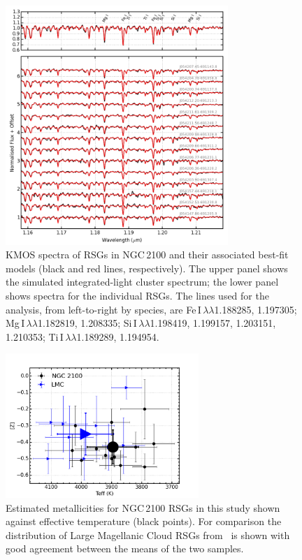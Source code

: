 \begin{figure}
 \begin{center}
 \centering
\includegraphics[width=0.75\textwidth]{ngc2100/NGC2100-model-fits}
\caption[KMOS spectra and best-fit model spectra in NGC\,2100]{KMOS spectra of RSGs in NGC\,2100 and their associated best-fit models
(black and red lines, respectively).
The upper panel shows the simulated integrated-light cluster spectrum;
the lower panel shows spectra for the individual RSGs.
The lines used for the analysis, from left-to-right by species, are
Fe\,{\scriptsize I}$\,\lambda\lambda$1.188285,
1.197305;
Mg\,{\scriptsize I}$\,\lambda\lambda$1.182819,
1.208335;
Si\,{\scriptsize I}$\,\lambda\lambda$1.198419,
1.199157,
1.203151,
1.210353;
Ti\,{\scriptsize I}$\,\lambda\lambda$1.189289,
1.194954.\label{fig:model_fits}}
\end{center}
\end{figure}

\begin{figure}
\centering
 \includegraphics[width=0.65\textwidth]{ngc2100/NGC2100-TeffvsZ-2100-LMC}
 \caption[Effective temperature as a function of metallicity for NGC\,2100]{Estimated metallicities for NGC\,2100 RSGs in this study shown against effective temperature (black points).
        For comparison the distribution of Large Magellanic Cloud RSGs from~\citet[][blue triangles]{2015ApJ...806...21D} is shown with good agreement between the means of the two samples.
\label{fig:TeffvsZ}
          }
\end{figure}

